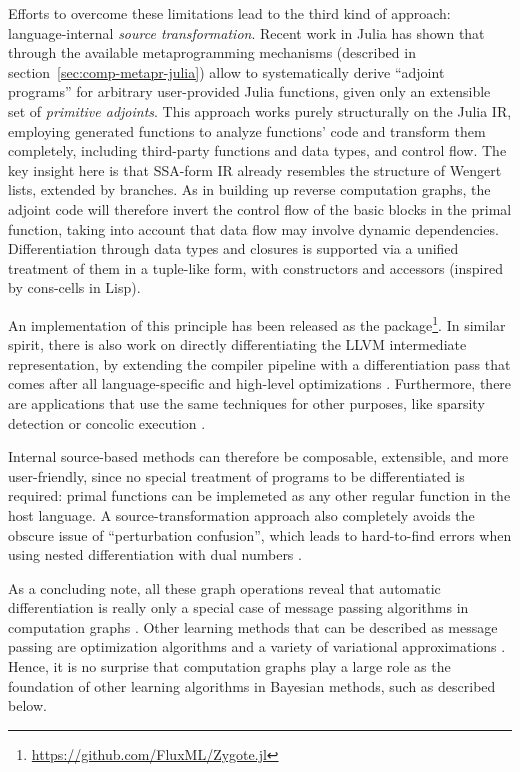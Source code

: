 Efforts to overcome these limitations lead to the third kind of approach: language-internal
\emph{source transformation}.  Recent work in Julia \parencite{innes2018don} has shown that through
the available metaprogramming mechanisms (described in section~\ref{sec:comp-metapr-julia}) allow to
systematically derive \enquote{adjoint programs} for arbitrary user-provided Julia functions, given
only an extensible set of \emph{primitive adjoints}.  This approach works purely structurally on the
Julia IR, employing generated functions to analyze functions' code and transform them completely,
including third-party functions and data types, and control flow.  The key insight here is that
SSA-form IR already resembles the structure of Wengert lists, extended by branches.  As in building
up reverse computation graphs, the adjoint code will therefore invert the control flow of the basic
blocks in the primal function, taking into account that data flow may involve dynamic dependencies.
Differentiation through data types and closures is supported via a unified treatment of them in a
tuple-like form, with constructors and accessors (inspired by cons-cells in Lisp).

An implementation of this principle has been released as the 
package\footnote{\url{https://github.com/FluxML/Zygote.jl}}.
In similar spirit, there is also work on directly differentiating the LLVM intermediate
representation, by extending the compiler pipeline with a differentiation pass that comes after all
language-specific and high-level optimizations \parencite{moses2020instead}.  Furthermore, there are
applications that use the same techniques for other purposes, like sparsity detection
\parencite{gowda2019sparsity} or concolic execution \parencite{churavy2020vchuravy}.

Internal source-based methods can therefore be composable, extensible, and more user-friendly, since
no special treatment of programs to be differentiated is required: primal functions can be
implemeted as any other regular function in the host language.  A source-transformation approach
also completely avoids the obscure issue of \enquote{perturbation confusion}, which leads to
hard-to-find errors when using nested differentiation with dual numbers
\parencite{baydin2018automatic,manzyuk2019perturbation}.

As a concluding note, all these graph operations reveal that automatic differentiation is really
only a special case of message passing algorithms in computation graphs
\parencite{minka2019automatic}.  Other learning methods that can be described as message passing are
optimization algorithms \parencite{ruozzi2011message,dauwels2005steepest} and a variety of
variational approximations \parencite{winn2005variational,minka2005divergence}.  Hence, it is no
surprise that computation graphs play a large role as the foundation of other learning algorithms in
Bayesian methods, such as described below.

